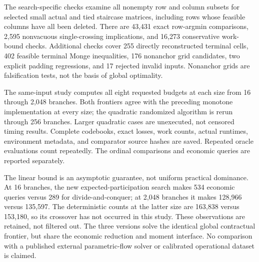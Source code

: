 The search-specific checks examine all nonempty row and column subsets for selected small actual and tied staircase matrices, including rows whose feasible columns have all been deleted. There are 43,431 exact row-argmin comparisons, 2,595 nonvacuous single-crossing implications, and 16,273 conservative work-bound checks. Additional checks cover 255 directly reconstructed terminal cells, 402 feasible terminal Monge inequalities, 176 nonanchor grid candidates, two explicit padding regressions, and 17 rejected invalid inputs. Nonanchor grids are falsification tests, not the basis of global optimality.

The same-input study computes all eight requested budgets at each size from 16 through 2,048 branches. Both frontiers agree with the preceding monotone implementation at every size; the quadratic randomized algorithm is rerun through 256 branches. Larger quadratic cases are unexecuted, not censored timing results. Complete codebooks, exact losses, work counts, actual runtimes, environment metadata, and comparator source hashes are saved. Repeated oracle evaluations count repeatedly. The ordinal comparisons and economic queries are reported separately.

The linear bound is an asymptotic guarantee, not uniform practical dominance. At 16 branches, the new expected-participation search makes 534 economic queries versus 289 for divide-and-conquer; at 2,048 branches it makes 128,966 versus 135,597. The deterministic counts at the latter size are 163,838 versus 153,180, so its crossover has not occurred in this study. These observations are retained, not filtered out. The three versions solve the identical global contractual frontier, but share the economic reduction and moment interface. No comparison with a published external parametric-flow solver or calibrated operational dataset is claimed.
